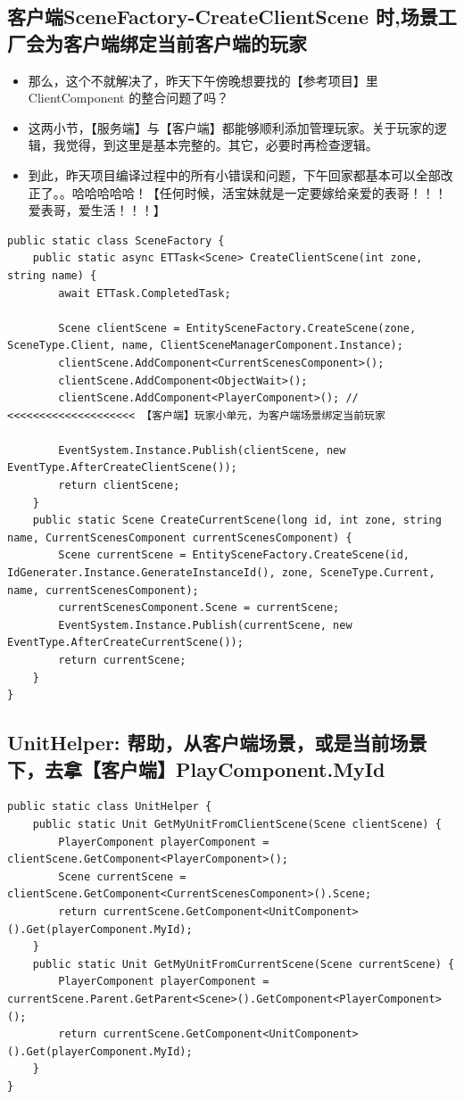 \documentclass[9pt, b5paper]{article}
\begin{document}
\subsection{客户端SceneFactory-CreateClientScene 时,场景工厂会为客户端绑定当前客户端的玩家}
\label{sec-9-7}
\begin{itemize}
\item 那么，这个不就解决了，昨天下午傍晚想要找的【参考项目】里 ClientComponent 的整合问题了吗？
\item 这两小节，【服务端】与【客户端】都能够顺利添加管理玩家。关于玩家的逻辑，我觉得，到这里是基本完整的。其它，必要时再检查逻辑。
\item 到此，昨天项目编译过程中的所有小错误和问题，下午回家都基本可以全部改正了。。哈哈哈哈哈！【任何时候，活宝妹就是一定要嫁给亲爱的表哥！！！爱表哥，爱生活！！！】
\end{itemize}
\begin{verbatim}
public static class SceneFactory {
    public static async ETTask<Scene> CreateClientScene(int zone, string name) {
        await ETTask.CompletedTask;

        Scene clientScene = EntitySceneFactory.CreateScene(zone, SceneType.Client, name, ClientSceneManagerComponent.Instance);
        clientScene.AddComponent<CurrentScenesComponent>();
        clientScene.AddComponent<ObjectWait>();
        clientScene.AddComponent<PlayerComponent>(); // <<<<<<<<<<<<<<<<<<<< 【客户端】玩家小单元，为客户端场景绑定当前玩家 

        EventSystem.Instance.Publish(clientScene, new EventType.AfterCreateClientScene()); 
        return clientScene;
    }
    public static Scene CreateCurrentScene(long id, int zone, string name, CurrentScenesComponent currentScenesComponent) {
        Scene currentScene = EntitySceneFactory.CreateScene(id, IdGenerater.Instance.GenerateInstanceId(), zone, SceneType.Current, name, currentScenesComponent);
        currentScenesComponent.Scene = currentScene;
        EventSystem.Instance.Publish(currentScene, new EventType.AfterCreateCurrentScene());
        return currentScene;
    }
}
\end{verbatim}
\subsection{UnitHelper: 帮助，从客户端场景，或是当前场景下，去拿【客户端】PlayComponent.MyId}
\label{sec-9-8}
\begin{verbatim}
public static class UnitHelper {
    public static Unit GetMyUnitFromClientScene(Scene clientScene) {
        PlayerComponent playerComponent = clientScene.GetComponent<PlayerComponent>();
        Scene currentScene = clientScene.GetComponent<CurrentScenesComponent>().Scene;
        return currentScene.GetComponent<UnitComponent>().Get(playerComponent.MyId);
    }
    public static Unit GetMyUnitFromCurrentScene(Scene currentScene) {
        PlayerComponent playerComponent = currentScene.Parent.GetParent<Scene>().GetComponent<PlayerComponent>();
        return currentScene.GetComponent<UnitComponent>().Get(playerComponent.MyId);
    }
}
\end{verbatim}
\end{document}
